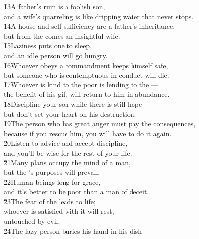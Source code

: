 \begin{poetry}
\poeml \v{13}A father's ruin is a foolish son, \\
\poemll    and a wife's quarreling is like dripping water that never stops. \\
\poeml \v{14}A house and self-sufficiency are a father's inheritance, \\
\poemll    but from the  comes an insightful wife. \\
\poeml \v{15}Laziness puts one to sleep, \\
\poemll    and an idle person will go hungry. \\
\poeml \v{16}Whoever obeys a commandment keeps himself safe, \\
\poemll    but someone who is contemptuous in conduct will die. \\
\poeml \v{17}Whoever is kind to the poor is lending to the --- \\
\poemll    the benefit of his gift will return to him in abundance. \\
\poeml \v{18}Discipline your son while there is still hope--- \\
\poemll    but don't set your heart on his destruction. \\
\poeml \v{19}The person who has great anger must pay the consequences, \\
\poemll    because if you rescue him, you will have to do it again. \\
\poeml \v{20}Listen to advice and accept discipline, \\
\poemll    and you'll be wise for the rest of your life. \\
\poeml \v{21}Many plans occupy the mind of a man, \\
\poemll    but the 's purposes will prevail. \\
\poeml \v{22}Human beings long for grace, \\
\poemll    and it's better to be poor than a man of deceit. \\
\poeml \v{23}The fear of the  leads to life; \\
\poemll    whoever is satisfied with it will rest, \\
\poemlll       untouched by evil. \\
\poeml \v{24}The lazy person buries his hand in his dish \\

\end{poetry}
